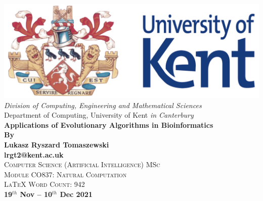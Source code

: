 \documentclass[12pt]{article}
\title{}
\begin{document}
\begin{titlepage}
\newcommand{\HRule}{\rule{\linewidth}{0.5mm}}
\begin{centering} 
\includegraphics[scale=0.4]{Media/Head.png} \\
\vspace{0.5cm} 
\large{\emph{Division of Computing, Engineering and Mathematical Sciences}} \\ [0.1cm]
\large{{Department of Computing, University of Kent \emph{in Canterbury}}} \\ [1.5cm]
\Huge{\bfseries{Applications of Evolutionary Algorithms in Bioinformatics}} \\ [1.5cm]
{\Large{\bfseries{By \\ [0.2cm] Lukasz Ryszard Tomaszewski}}}\\[-0.2cm]
{\large{\bfseries{lrgt2@kent.ac.uk}}}\\[0.5cm]
\textsc{\Large Computer Science (Artificial Intelligence) MSc}\\ [-0.2cm]
\textsc{\Large Module CO837: Natural Computation}\\ [0.3cm]
\textsc{\large LaTeX Word Count: 942}\\ [1.8cm]
\textbf{\Large{19$^{th}$ Nov -- 10$^{th}$ Dec 2021}}\\
\end{centering} 
\end{titlepage}
\newpage
\begin{titlepage}
\begin{tableofcontents}
\end{tableofcontents}
\end{titlepage}
\newpage
\end{document}
